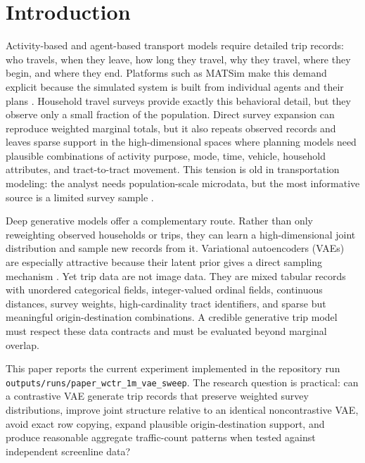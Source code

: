 \documentclass[3p,times,procedia]{elsarticle}
\begin{document}
\newpage

\section{Introduction}
Activity-based and agent-based transport models require detailed trip records: who travels, when they leave, how long they travel, why they travel, where they begin, and where they end. Platforms such as MATSim make this demand explicit because the simulated system is built from individual agents and their plans \cite{horni2016matsim}. Household travel surveys provide exactly this behavioral detail, but they observe only a small fraction of the population. Direct survey expansion can reproduce weighted marginal totals, but it also repeats observed records and leaves sparse support in the high-dimensional spaces where planning models need plausible combinations of activity purpose, mode, time, vehicle, household attributes, and tract-to-tract movement. This tension is old in transportation modeling: the analyst needs population-scale microdata, but the most informative source is a limited survey sample \cite{beckman1996creating,farooq2013simulation}.

Deep generative models offer a complementary route. Rather than only reweighting observed households or trips, they can learn a high-dimensional joint distribution and sample new records from it. Variational autoencoders (VAEs) are especially attractive because their latent prior gives a direct sampling mechanism \cite{kingma2014autoencoding}. Yet trip data are not image data. They are mixed tabular records with unordered categorical fields, integer-valued ordinal fields, continuous distances, survey weights, high-cardinality tract identifiers, and sparse but meaningful origin-destination combinations. A credible generative trip model must respect these data contracts and must be evaluated beyond marginal overlap.

This paper reports the current experiment implemented in the repository run \texttt{outputs/runs/paper\_wctr\_1m\_vae\_sweep}. The research question is practical: can a contrastive VAE generate trip records that preserve weighted survey distributions, improve joint structure relative to an identical noncontrastive VAE, avoid exact row copying, expand plausible origin-destination support, and produce reasonable aggregate traffic-count patterns when tested against independent screenline data?
\end{document}
